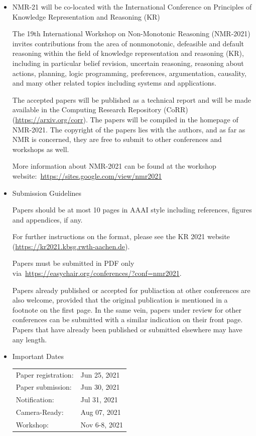 \documentclass[prodmode,acmtecs]{acmsmall} %
\begin{document}
\begin{itemize}\item  NMR-21 will be co-located with the International Conference on Principles of Knowledge Representation and Reasoning (KR) 
 
  The 19th International Workshop on Non-Monotonic Reasoning (NMR-2021) invites contributions from the area of nonmonotonic, defeasible and default reasoning within the field of knowledge representation and reasoning (KR), including in particular belief revision, uncertain reasoning, reasoning about actions, planning, logic programming, preferences, argumentation, causality, and many other related topics including systems and applications. 
 
  The accepted papers will be published as a technical report and will be made available in the Computing Research Repository (CoRR) (\href{https://arxiv.org/corr}{https://arxiv.org/corr}). The papers will be compiled in the homepage of NMR-2021. The copyright of the papers lies with the authors, and as far as NMR is concerned, they are free to submit to other conferences and workshops as well. 
 
  More information about NMR-2021 can be found at the workshop website: \href{https://sites.google.com/view/nmr2021}{https://sites.google.com/view/nmr2021} 
 
\item  Submission Guidelines 
 
  Papers should be at most 10 pages in AAAI style including references, figures and appendices, if any. 
 
  For further instructions on the format, please see the KR 2021 website (\href{https://kr2021.kbsg.rwth-aachen.de}{https://kr2021.kbsg.rwth-aachen.de}). 
 
  Papers must be submitted in PDF only via \href{https://easychair.org/conferences/?conf=nmr2021}{https://easychair.org/conferences/?conf=nmr2021}. 
 
  Papers already published or accepted for publiaction at other conferences are also welcome, provided that the original publication is mentioned in a footnote on the first page. In the same vein, papers under review for other conferences can be submitted with a similar indication on their front page. Papers that have already been published or submitted elsewhere may have any length. 
 
\item  Important Dates 
 
\begin{tabulary}{\linewidth}{LL}Paper registration:  & Jun 25, 2021 \\
Paper submission:  & Jun 30, 2021 \\
Notification:  & Jul 31, 2021 \\
Camera-Ready:  & Aug 07, 2021 \\
Workshop:  & Nov 6-8,  2021 \\
\end{tabulary}
 

\end{itemize}
\end{document}
